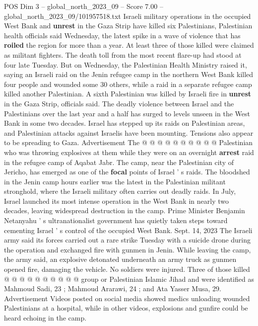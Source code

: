\begin{textsample}{POS Dim 3 – global\_north\_2023\_09 – Score 7.00 – global\_north\_2023\_09/101957518.txt}  \label{ex:f3_pos_063}
Israeli military operations in the occupied West Bank and \textbf{unrest} in the Gaza Strip have killed six Palestinians, Palestinian health officials said Wednesday, the latest spike in a wave of violence that has \textbf{roiled} the region for more than a year.
At least three of those killed were claimed as militant fighters.
The death toll from the most recent flare-up had stood at four late Tuesday.
But on Wednesday, the Palestinian Health Ministry raised it, saying an Israeli raid on the Jenin refugee camp in the northern West Bank killed four people and wounded some 30 others, while a raid in a separate refugee camp killed another Palestinian.
A sixth Palestinian was killed by Israeli fire in \textbf{unrest} in the Gaza Strip, officials said.
The deadly violence between Israel and the Palestinians over the last year and a half has surged to levels unseen in the West Bank in some two decades.
Israel has stepped up its raids on Palestinian areas, and Palestinian attacks against Israelis have been mounting.
Tensions also appear to be spreading to Gaza.
Advertisement The @ @ @ @ @ @ @ @ @ @ Palestinian who was throwing explosives at them while they were on an overnight \textbf{arrest} raid in the refugee camp of Aqabat Jabr.
The camp, near the Palestinian city of Jericho, has emerged as one of the \textbf{focal} points of Israel ' s raids.
The bloodshed in the Jenin camp hours earlier was the latest in the Palestinian militant stronghold, where the Israeli military often carries out deadly raids.
In July, Israel launched its most intense operation in the West Bank in nearly two decades, leaving widespread destruction in the camp.
Prime Minister Benjamin Netanyahu ' s ultranationalist government has quietly taken steps toward cementing Israel ' s control of the occupied West Bank.
Sept. 14, 2023 The Israeli army said its forces carried out a rare strike Tuesday with a suicide drone during the operation and exchanged fire with gunmen in Jenin.
While leaving the camp, the army said, an explosive detonated underneath an army truck as gunmen opened fire, damaging the vehicle.
No soldiers were injured.
Three of those killed @ @ @ @ @ @ @ @ @ @ group or Palestinian Islamic Jihad and were identified as Mahmoud Sadi, 23 ; Mahmoud Ararawi, 24 ; and Ata Yasser Musa, 29.
Advertisement Videos posted on social media showed medics unloading wounded Palestinians at a hospital, while in other videos, explosions and gunfire could be heard echoing in the camp.

\end{textsample}
